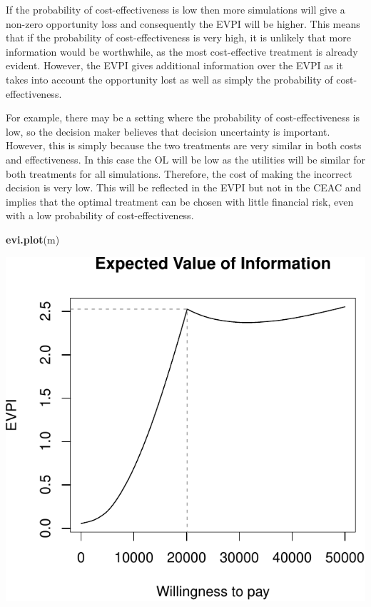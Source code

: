 \documentclass[]{article}
\newenvironment{Shaded}{\begin{snugshade}}{\end{snugshade}}
\newcommand{\KeywordTok}[1]{\textcolor[rgb]{0.13,0.29,0.53}{\textbf{#1}}}
\newcommand{\NormalTok}[1]{#1}
\begin{document}
If the probability of cost-effectiveness is low then more simulations
will give a non-zero opportunity loss and consequently the EVPI will be
higher. This means that if the probability of cost-effectiveness is very
high, it is unlikely that more information would be worthwhile, as the
most cost-effective treatment is already evident. However, the EVPI
gives additional information over the EVPI as it takes into account the
opportunity lost as well as simply the probability of
cost-effectiveness.

For example, there may be a setting where the probability of
cost-effectiveness is low, so the decision maker believes that decision
uncertainty is important. However, this is simply because the two
treatments are very similar in both costs and effectiveness. In this
case the OL will be low as the utilities will be similar for both
treatments for all simulations. Therefore, the cost of making the
incorrect decision is very low. This will be reflected in the EVPI but
not in the CEAC and implies that the optimal treatment can be chosen
with little financial risk, even with a low probability of
cost-effectiveness.

\begin{Shaded}
\begin{Highlighting}[]
\KeywordTok{evi.plot}\NormalTok{(m)}
\end{Highlighting}
\end{Shaded}

\begin{center}\includegraphics{report_files/figure-latex/unnamed-chunk-8-1} \end{center}
\end{document}
